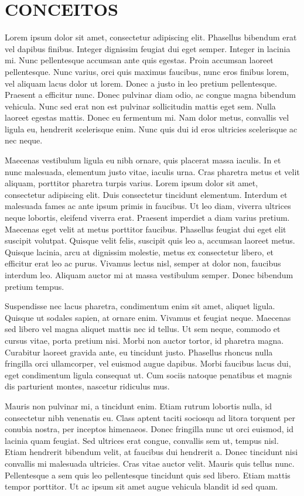 \chapter{CONCEITOS}\label{ch:conceitos}

Lorem ipsum dolor sit amet, consectetur adipiscing elit. Phasellus bibendum erat vel dapibus finibus. Integer dignissim feugiat dui eget semper. Integer in lacinia mi. Nunc pellentesque accumsan ante quis egestas. Proin accumsan laoreet pellentesque. Nunc varius, orci quis maximus faucibus, nunc eros finibus lorem, vel aliquam lacus dolor ut lorem. Donec a justo in leo pretium pellentesque. Praesent a efficitur nunc. Donec pulvinar diam odio, ac congue magna bibendum vehicula. Nunc sed erat non est pulvinar sollicitudin mattis eget sem. Nulla laoreet egestas mattis. Donec eu fermentum mi. Nam dolor metus, convallis vel ligula eu, hendrerit scelerisque enim. Nunc quis dui id eros ultricies scelerisque ac nec neque.

Maecenas vestibulum ligula eu nibh ornare, quis placerat massa iaculis. In et nunc malesuada, elementum justo vitae, iaculis urna. Cras pharetra metus et velit aliquam, porttitor pharetra turpis varius. Lorem ipsum dolor sit amet, consectetur adipiscing elit. Duis consectetur tincidunt elementum. Interdum et malesuada fames ac ante ipsum primis in faucibus. Ut leo diam, viverra ultrices neque lobortis, eleifend viverra erat. Praesent imperdiet a diam varius pretium. Maecenas eget velit at metus porttitor faucibus. Phasellus feugiat dui eget elit suscipit volutpat. Quisque velit felis, suscipit quis leo a, accumsan laoreet metus. Quisque lacinia, arcu at dignissim molestie, metus ex consectetur libero, et efficitur erat leo ac purus. Vivamus lectus nisl, semper at dolor non, faucibus interdum leo. Aliquam auctor mi at massa vestibulum semper. Donec bibendum pretium tempus.

Suspendisse nec lacus pharetra, condimentum enim sit amet, aliquet ligula. Quisque ut sodales sapien, at ornare enim. Vivamus et feugiat neque. Maecenas sed libero vel magna aliquet mattis nec id tellus. Ut sem neque, commodo et cursus vitae, porta pretium nisi. Morbi non auctor tortor, id pharetra magna. Curabitur laoreet gravida ante, eu tincidunt justo. Phasellus rhoncus nulla fringilla orci ullamcorper, vel euismod augue dapibus. Morbi faucibus lacus dui, eget condimentum ligula consequat ut. Cum sociis natoque penatibus et magnis dis parturient montes, nascetur ridiculus mus.

Mauris non pulvinar mi, a tincidunt enim. Etiam rutrum lobortis nulla, id consectetur nibh venenatis eu. Class aptent taciti sociosqu ad litora torquent per conubia nostra, per inceptos himenaeos. Donec fringilla nunc ut orci euismod, id lacinia quam feugiat. Sed ultrices erat congue, convallis sem ut, tempus nisl. Etiam hendrerit bibendum velit, at faucibus dui hendrerit a. Donec tincidunt nisi convallis mi malesuada ultricies. Cras vitae auctor velit. Mauris quis tellus nunc. Pellentesque a sem quis leo pellentesque tincidunt quis sed libero. Etiam mattis tempor porttitor. Ut ac ipsum sit amet augue vehicula blandit id sed quam.


